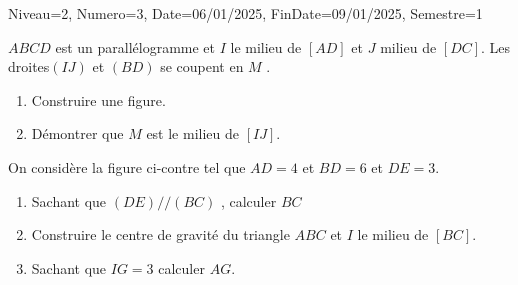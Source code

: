 \documentclass[a4paper,12pt]{article}
\begin{document}
\begin{Maquette}[DM]{Niveau=2, Numero=3, Date=06/01/2025, FinDate=09/01/2025, Semestre=1}

\begin{exercice}
$ABCD$ est un parallélogramme et  $I$ le milieu de  $[AD]$ et $J$ milieu de $[DC]$. Les droites$(IJ)$ et $(BD)$ se coupent en  $M$ .
\begin{enumerate}
\item Construire une figure.
\item Démontrer que $M$ est le milieu de $[IJ]$.
\end{enumerate}
\end{exercice}

\begin{exercice}
\begin{minipage}{0.6\linewidth}

On considère la figure ci-contre tel que $AD=4$ et $BD=6$ et $DE=3$. 
\begin{enumerate}
\item Sachant que $(DE)//(BC)$ , calculer $BC$
\item Construire le centre de gravité du triangle $ABC$ et $I$ le milieu de $[BC]$.
\item Sachant que  $IG=3$ calculer $AG$.
\end{enumerate}
\end{minipage}
\begin{minipage}{0.4\linewidth}
\end{minipage}
\end{exercice}


\end{Maquette}
\end{document}
